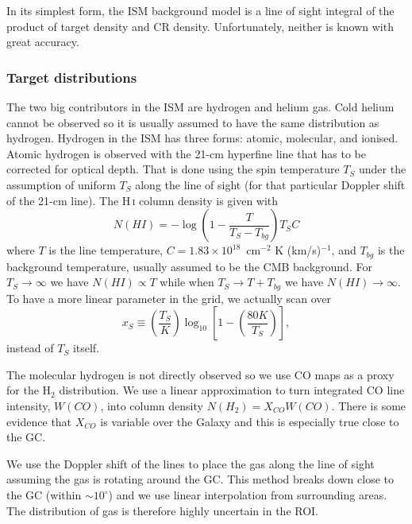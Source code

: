 \documentclass{article}
\begin{document}
   In its simplest form, the ISM background model is a line of sight integral
   of the product of target density and CR density.  Unfortunately, neither is
   known with great accuracy.

\subsubsection*{Target distributions} 
   
   The two big contributors in the ISM are hydrogen and helium gas.  Cold helium
   cannot be observed so it is usually assumed to have the same distribution
   as hydrogen.  Hydrogen in the ISM has three forms: atomic, molecular, and
   ionised.  Atomic hydrogen is observed with the 21-cm hyperfine line that has to
   be corrected for optical depth.  That is done using the spin temperature
   $T_S$ under the assumption of uniform $T_S$ along the line of sight (for
   that particular Doppler shift of the 21-cm line).  The H\,\textsc{i} column density is
   given with
   \begin{equation}
      N(HI) = -\log\left(1-\frac{T}{T_S - T_{bg}}\right) T_S C
      \label{eq:spinTemperature}
   \end{equation}
   where $T$ is the line temperature, $C = 1.83\times10^{18}$~cm$^{-2}$ K
   (km/s)$^{-1}$, and $T_{bg}$ is the
   background temperature, usually assumed to be the CMB background.  For $T_S
   \rightarrow \infty$ we have $N(HI) \propto T$ while when $T_S \rightarrow
   T+T_{bg}$ we have $N(HI) \rightarrow \infty$.  To have a more linear
   parameter in the grid, we actually scan over 
   \begin{equation}
    x_S \equiv \left(\frac{T_S}{K}\right)\log_{10}\left[1-\left(\frac{80K}{T_S}\right)\right],
   \end{equation}
   instead of $T_S$ itself.

   The molecular hydrogen is not directly observed so we use CO maps as a proxy for the H$_2$ distribution.
   We use a linear approximation to turn integrated CO line intensity, $W(CO)$,
   into column density $N(H_2) = X_{CO} W(CO)$.  There is some evidence that
   $X_{CO}$ is variable over the Galaxy and this is especially true close to
   the GC.

   We use the Doppler shift of the lines to place the gas along the line of
   sight assuming the gas is rotating around the GC.  This method breaks down
   close to the GC (within $\sim 10^\circ$) and we use linear interpolation
   from surrounding areas.  The distribution of gas is therefore highly
   uncertain in the ROI.
\end{document}
